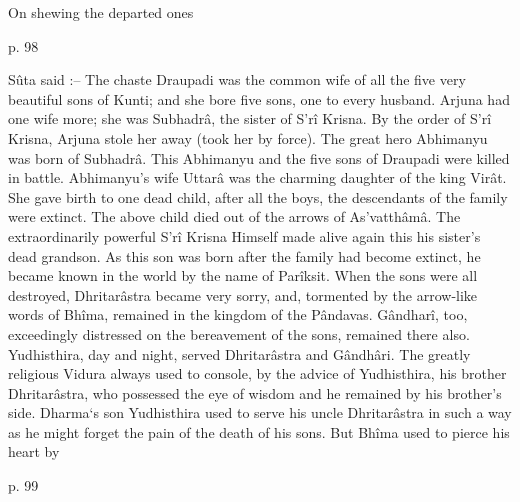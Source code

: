 ﻿On shewing the departed ones

 

p. 98

 

Sûta said :--  The chaste Draupadi was the common wife of all the five very beautiful sons of Kunti; and she bore five sons, one to every husband. Arjuna had one wife more; she was Subhadrâ, the sister of S’rî Krisna. By the order of S’rî Krisna, Arjuna stole her away (took her by force). The great hero Abhimanyu was born of Subhadrâ. This Abhimanyu and the five sons of Draupadi were killed in battle. Abhimanyu's wife Uttarâ was the charming daughter of the king Virât. She gave birth to one dead child, after all the boys, the descendants of the family were extinct. The above child died out of the arrows of As'vatthâmâ. The extraordinarily powerful S’rî Krisna Himself made alive again this his sister's dead grandson. As this son was born after the family had become extinct, he became known in the world by the name of Parîksit. When the sons were all destroyed, Dhritarâstra became very sorry, and, tormented by the arrow-like words of Bhîma, remained in the kingdom of the Pândavas. Gândharî, too, exceedingly distressed on the bereavement of the sons, remained there also. Yudhisthira, day and night, served Dhritarâstra and Gândhâri. The greatly religious Vidura always used to console, by the advice of Yudhisthira, his brother Dhritarâstra, who possessed the eye of wisdom and he remained by his brother's side. Dharma`s son Yudhisthira used to serve his uncle Dhritarâstra in such a way as he might forget the pain of the death of his sons. But Bhîma used to pierce his heart by

 

p. 99

 

